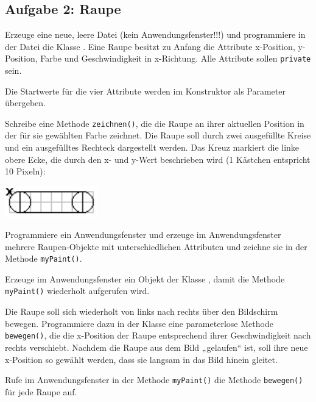 \subsection{Aufgabe 2: Raupe}

\begin{compactenum}[a)]
\item Erzeuge eine neue, leere Datei (kein Anwendungsfenster!!!) und
programmiere in der Datei die Klasse . Eine Raupe besitzt zu
Anfang die Attribute x-Position, y-Position, Farbe und Geschwindigkeit in
x-Richtung. Alle Attribute sollen \lstinline|private| sein.

Die Startwerte für die vier Attribute werden im Konstruktor als
Parameter übergeben.

Schreibe eine Methode \lstinline|zeichnen()|, die die Raupe an ihrer aktuellen
Position in der für sie gewählten Farbe zeichnet. Die Raupe soll durch zwei
ausgefüllte Kreise und ein ausgefülltes Rechteck dargestellt werden. Das Kreuz
markiert die linke obere Ecke, die durch den x- und y-Wert beschrieben wird (1
Kästchen entspricht 10 Pixeln):

\begin{center}
\includegraphics[width=0.3\textwidth]{./inf/SEKII/10_Java_Klassen/raupe_lang.png}
\end{center}

\item Programmiere ein Anwendungsfenster und erzeuge im Anwendungsfenster
mehrere Raupen-Objekte mit unterschiedlichen Attributen und zeichne sie in der
Methode \lstinline|myPaint()|.

\item Erzeuge im Anwendungsfenster ein Objekt der Klasse , damit
die Methode \lstinline|myPaint()| wiederholt aufgerufen wird.

\item Die Raupe soll sich wiederholt von links nach rechts über den Bildschirm
bewegen. Programmiere dazu in der Klasse  eine parameterlose
Methode \lstinline|bewegen()|, die die x-Position der Raupe entsprechend ihrer
Geschwindigkeit nach rechts verschiebt. Nachdem die Raupe aus dem Bild
„gelaufen“ ist, soll ihre neue x-Position so gewählt werden, dass sie langsam
in das Bild hinein gleitet.

Rufe im Anwendungsfenster in der Methode \lstinline|myPaint()| die Methode
\lstinline|bewegen()| für jede Raupe auf.


\end{compactenum}
